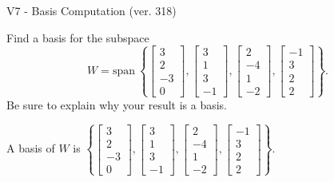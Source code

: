 \begin{exercise}
  \begin{exerciseTitle}V7 - Basis Computation (ver. 318)\end{exerciseTitle}
  \begin{exerciseStatement}
    Find a basis for the subspace 
\[W=\mathrm{span}\ \left\{\left[\begin{array}{r}
3 \\
2 \\
-3 \\
0
\end{array}\right] , \left[\begin{array}{r}
3 \\
1 \\
3 \\
-1
\end{array}\right] , \left[\begin{array}{r}
2 \\
-4 \\
1 \\
-2
\end{array}\right] , \left[\begin{array}{r}
-1 \\
3 \\
2 \\
2
\end{array}\right]\right\}.\]
 Be sure to explain why your result is a basis.


  \end{exerciseStatement}
  \begin{exerciseAnswer}
   A basis of \(W\) is  \(\left\{\left[\begin{array}{r}
3 \\
2 \\
-3 \\
0
\end{array}\right] , \left[\begin{array}{r}
3 \\
1 \\
3 \\
-1
\end{array}\right] , \left[\begin{array}{r}
2 \\
-4 \\
1 \\
-2
\end{array}\right] , \left[\begin{array}{r}
-1 \\
3 \\
2 \\
2
\end{array}\right]\right\}\).
  


  \end{exerciseAnswer}
\end{exercise}